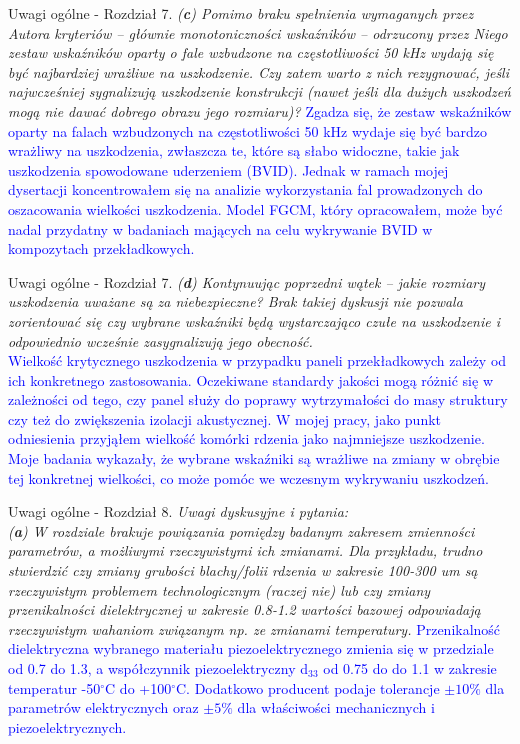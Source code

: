 \documentclass[10pt,aspectratio=169]{beamer} %
\begin{document}
\begin{frame}[label=frame31]{Uwagi ogólne - Rozdział 7.}\justifying
\textit{(\textbf{c}) Pomimo braku spełnienia wymaganych przez Autora kryteriów – głównie monotoniczności wskaźników – odrzucony przez Niego zestaw wskaźników oparty o fale wzbudzone na częstotliwości 50 kHz wydają się być najbardziej wrażliwe na uszkodzenie. Czy zatem warto z nich rezygnować, jeśli najwcześniej sygnalizują uszkodzenie konstrukcji (nawet jeśli dla dużych uszkodzeń mogą nie dawać dobrego obrazu jego rozmiaru)?} \textcolor{blue}{Zgadza się, że zestaw wskaźników oparty na falach wzbudzonych na częstotliwości 50 kHz wydaje się być bardzo wrażliwy na uszkodzenia, zwłaszcza te, które są słabo widoczne, takie jak uszkodzenia spowodowane uderzeniem (BVID). Jednak w ramach mojej dysertacji koncentrowałem się na analizie wykorzystania fal prowadzonych do oszacowania wielkości uszkodzenia. Model FGCM, który opracowałem, może być nadal przydatny w badaniach mających na celu wykrywanie BVID w kompozytach przekładkowych.} 
\end{frame}
\begin{frame}[label=frame32]{Uwagi ogólne - Rozdział 7.}\justifying
\textit{(\textbf{d}) Kontynuując poprzedni wątek – jakie rozmiary uszkodzenia uważane są za niebezpieczne? Brak takiej dyskusji nie pozwala zorientować się czy wybrane wskaźniki będą wystarczająco czułe na uszkodzenie i odpowiednio wcześnie zasygnalizują jego obecność.}\\
\textcolor{blue}{Wielkość krytycznego uszkodzenia w przypadku paneli przekładkowych zależy od ich konkretnego zastosowania. Oczekiwane standardy jakości mogą różnić się w zależności od tego, czy panel służy do poprawy wytrzymałości do masy struktury czy też do zwiększenia izolacji akustycznej. W mojej pracy, jako punkt odniesienia przyjąłem wielkość komórki rdzenia jako najmniejsze uszkodzenie. Moje badania wykazały, że wybrane wskaźniki są wrażliwe na zmiany w obrębie tej konkretnej wielkości, co może pomóc we wczesnym wykrywaniu uszkodzeń.} 
\end{frame}
\begin{frame}[label=frame33]{Uwagi ogólne - Rozdział 8.}\justifying
\textit{Uwagi dyskusyjne i pytania:\\
(\textbf{a}) W rozdziale brakuje powiązania pomiędzy badanym zakresem zmienności parametrów,
a możliwymi rzeczywistymi ich zmianami. Dla przykładu, trudno stwierdzić czy zmiany	grubości blachy/folii rdzenia w zakresie 100-300 um są rzeczywistym problemem technologicznym (raczej nie) lub czy zmiany przenikalności dielektrycznej w zakresie 0.8-1.2 wartości bazowej odpowiadają rzeczywistym wahaniom związanym np. ze zmianami temperatury.} \textcolor{blue}{Przenikalność dielektryczna wybranego materiału piezoelektrycznego zmienia się w przedziale od 0.7 do 1.3, a współczynnik piezoelektryczny d\(_{33}\) od 0.75 do do 1.1 w zakresie temperatur -50\(^{\circ}\)C do +100\(^{\circ}\)C. Dodatkowo producent podaje tolerancje \(\pm 10\%\) dla parametrów elektrycznych oraz \(\pm 5\%\) dla właściwości mechanicznych i piezoelektrycznych.}
\end{frame}
\end{document}
